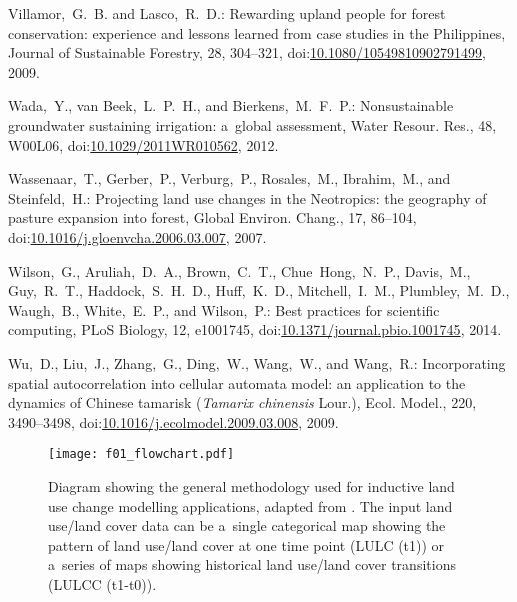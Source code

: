 \documentclass[gmdd, online, hvmath]{copernicus}
\begin{document}
\begin{thebibliography}{97}
 Villamor,~G.~B. and
  Lasco,~R.~D.: Rewarding upland people for forest conservation:
  experience and lessons learned from case studies in the Philippines,
  Journal of Sustainable Forestry, 28, 304--321,
doi:\href{http://dx.doi.org/10.1080/10549810902791499}{10.1080/10549810902791499}, 2009.


  Wada,~Y., van Beek,~L.~P.~H., and Bierkens,~M.~F.~P.: Nonsustainable
  groundwater sustaining irrigation: a~global assessment, Water
  Resour. Res., 48, W00L06,
doi:\href{http://dx.doi.org/10.1029/2011WR010562}{10.1029/2011WR010562},
2012.

 Wassenaar,~T., Gerber,~P.,
  Verburg,~P., Rosales,~M., Ibrahim,~M., and Steinfeld,~H.: Projecting
  land use changes in the Neotropics: the geography of pasture
  expansion into forest, Global Environ. Chang., 17, 86--104,
  doi:\href{http://dx.doi.org/10.1016/j.gloenvcha.2006.03.007}{10.1016/j.gloenvcha.2006.03.007}, 2007.


 Wilson,~G., Aruliah,~D.~A., Brown,~C.~T.,
  Chue~Hong,~N.~P., Davis,~M., Guy,~R.~T., Haddock,~S.~H.~D.,
  Huff,~K.~D., Mitchell,~I.~M., Plumbley,~M.~D., Waugh,~B.,
  White,~E.~P., and Wilson,~P.: Best practices for scientific
  computing, {PLoS} Biology, 12, e1001745,
  doi:\href{http://dx.doi.org/10.1371/journal.pbio.1001745}{10.1371/journal.pbio.1001745}, 2014.


 Wu,~D., Liu,~J., Zhang,~G., Ding,~W., Wang,~W., and
  Wang,~R.: Incorporating spatial autocorrelation into cellular
  automata model: an application to the dynamics of Chinese tamarisk
  (\textit{Tamarix chinensis} Lour.), Ecol. Model., 220, 3490--3498,
  doi:\href{http://dx.doi.org/10.1016/j.ecolmodel.2009.03.008}{10.1016/j.ecolmodel.2009.03.008}, 2009.

\end{thebibliography}

\begin{figure}[t]
  \texttt{[image: f01\_flowchart.pdf]}
  \caption{Diagram showing the general methodology used for inductive land use change modelling applications, adapted from \citet{mas2014}. The input land use/land cover data can be a~single categorical map showing the pattern of land use/land cover at one time point (LULC (t1)) or a~series of maps showing historical land use/land cover transitions (LULCC (t1-t0)).}
  \label{fig:flowchart}
\end{figure}
\end{document}
